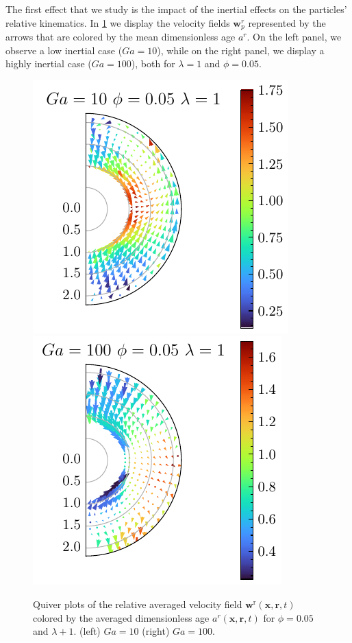 The first effect that we study is the impact of the inertial effects on the particles' relative kinematics.  
In \ref{fig:Why_Ga_matter} we display the velocity fields $\textbf{w}_p^r$ represented by the arrows that are colored by the mean dimensionless age $a^r$.  
On the left panel, we observe a low inertial case ($Ga = 10$), while on the right panel, we display a highly inertial case ($Ga=100$), both for $\lambda =1$ and $\phi=0.05$.
\begin{figure}[h!]
    \centering
    \includegraphics[height=0.35\textwidth]{image/HOMOGENEOUS_NEW/Dist/U_rel_l_1_Ga_10_PHI_5.pdf}
    \includegraphics[height=0.35\textwidth]{image/HOMOGENEOUS_NEW/Dist/U_rel_l_1_Ga_100_PHI_5.pdf}
    \caption{
         Quiver plots of the relative averaged velocity field $\textbf{w}^\text{r}(\textbf{x},\textbf{r},t)$ colored by the averaged dimensionless age $a^r(\textbf{x},\textbf{r},t)$ for $\phi = 0.05$ and $\lambda +1$.
         (left) $Ga = 10$ (right) $Ga =100$. }
    \label{fig:Why_Ga_matter}
\end{figure}

